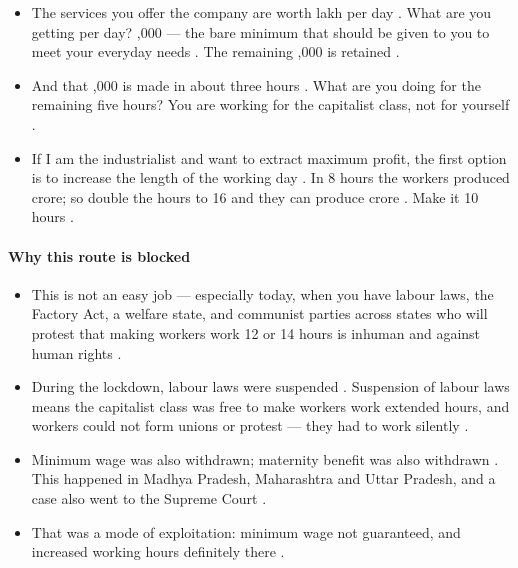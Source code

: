 \begin{ExampleBox}
\begin{itemize}
    \item The services you offer the company are worth  lakh per day . What are you getting per day? ,000 --- the bare minimum that should be given to you to meet your everyday needs . The remaining ,000 is retained .
    \item And that ,000 is made in about three hours . What are you doing for the remaining five hours? You are working for the capitalist class, not for yourself .
\end{itemize}
\end{ExampleBox}

\begin{itemize}
    \item If I am the industrialist and want to extract maximum profit, the first option is to increase the length of the working day . In 8 hours the workers produced  crore; so double the hours to 16 and they can produce  crore . Make it 10 hours .
\end{itemize}

\paragraph{Why this route is blocked}
\begin{itemize}
    \item This is not an easy job --- especially today, when you have labour laws, the Factory Act, a welfare state, and communist parties across states who will protest that making workers work 12 or 14 hours is inhuman and against human rights .
\end{itemize}

\begin{GovtPolicy}
\begin{itemize}
    \item During the lockdown, labour laws were suspended . Suspension of labour laws means the capitalist class was free to make workers work extended hours, and workers could not form unions or protest --- they had to work silently .
    \item Minimum wage was also withdrawn; maternity benefit was also withdrawn . This happened in Madhya Pradesh, Maharashtra and Uttar Pradesh, and a case also went to the Supreme Court .
    \item That was a mode of exploitation: minimum wage not guaranteed, and increased working hours definitely there .
\end{itemize}
\end{GovtPolicy}

